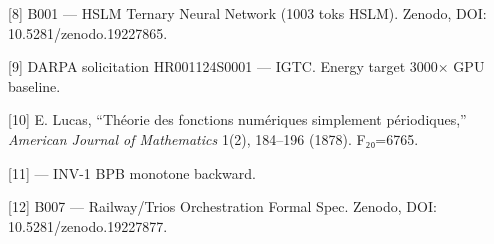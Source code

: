 [8] B001 --- HSLM Ternary Neural Network (1003
toks HSLM). Zenodo, DOI: 10.5281/zenodo.19227865.

[9] DARPA solicitation HR001124S0001 --- IGTC.
Energy target 3000$\times$ GPU baseline.

[10] E. Lucas, ``Théorie des fonctions
numériques simplement périodiques,''
\emph{American Journal of Mathematics} 1(2),
184--196 (1878). F₂₀=6765.

[11]
--- INV-1 BPB monotone backward.

[12] B007 --- Railway/Trios Orchestration
Formal Spec. Zenodo, DOI: 10.5281/zenodo.19227877.

